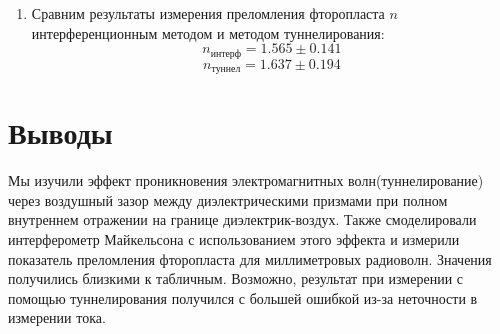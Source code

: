 \documentclass[a4paper,12pt]{article}
\begin{document}
\begin{enumerate}
    \item Сравним результаты измерения преломления фторопласта $n$ интерференционным методом и методом туннелирования:
    $$
    n_\text{интерф} = 1.565 \pm 0.141
    $$
    $$
    n_\text{туннел} = 1.637 \pm 0.194
    $$
\end{enumerate}

\section{Выводы}
Мы изучили эффект проникновения электромагнитных волн(туннелирование) через воздушный зазор между диэлектрическими призмами при полном внутреннем отражении на границе диэлектрик-воздух. Также смоделировали интерферометр Майкельсона с использованием этого эффекта и измерили показатель преломления фторопласта для миллиметровых радиоволн. Значения получились близкими к табличным. Возможно, результат при измерении с помощью туннелирования получился с большей ошибкой из-за неточности в измерении тока.
\end{document}
